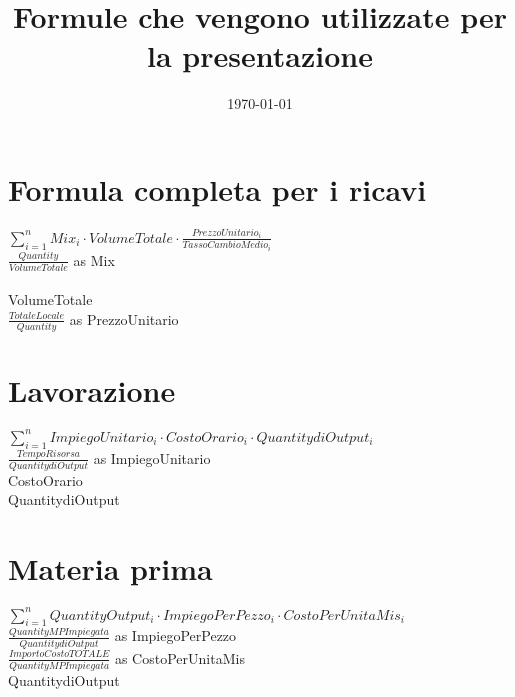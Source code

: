 \documentclass[14pt]{extarticle}
\title{Formule che vengono utilizzate per la presentazione}
\date{\today}
\begin{document}
\maketitle
\section{Formula completa per i ricavi}
$\sum_{i=1} ^{n} Mix_{i}\cdot VolumeTotale \cdot $$\frac{PrezzoUnitario_{i}}{TassoCambioMedio_{i}}$
\bigskip
\\$\frac{Quantity}{VolumeTotale}$ as Mix\\
\bigskip
\\VolumeTotale
\bigskip
\\$\frac{TotaleLocale}{Quantity}$ as PrezzoUnitario

\section{Lavorazione}
$\sum_{i=1} ^{n} ImpiegoUnitario_i \cdot CostoOrario_i \cdot QuantitydiOutput_i$
\bigskip
\\$\frac{TempoRisorsa}{QuantitydiOutput}$ as ImpiegoUnitario
\bigskip
\bigskip
\\CostoOrario
\bigskip
\bigskip
\\QuantitydiOutput

\section{Materia prima}
$\sum_{i=1} ^{n}QuantityOutput_i \cdot ImpiegoPerPezzo_i\cdot CostoPerUnitaMis_i$
\bigskip
\\$\frac{QuantityMPImpiegata}{QuantitydiOutput}$ as ImpiegoPerPezzo
\bigskip
\bigskip
\\$\frac {ImportoCostoTOTALE}{QuantityMPImpiegata}$ as CostoPerUnitaMis
\bigskip
\bigskip
\\QuantitydiOutput
\end{document}
